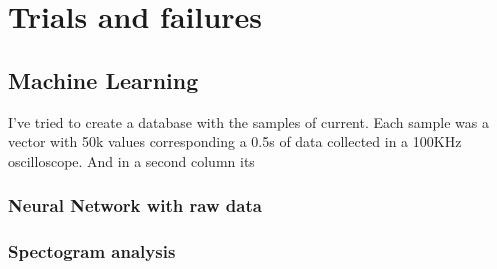 \chapter{Trials and failures}

\section{Machine Learning}

I've tried to create a database with the samples of current. Each sample was a vector with 50k values corresponding a 0.5s of data collected in a 100KHz oscilloscope. And in a second column its 


\subsection{Neural Network with raw data}

\subsection{Spectogram analysis}

